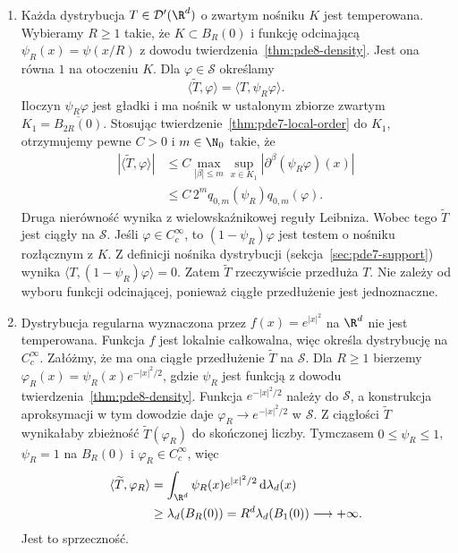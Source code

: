 \begin{przyklad}
\begin{enumerate}
\item Każda dystrybucja $T\in\mathcal D'(\R^d)$
o zwartym nośniku $K$ jest temperowana.
Wybieramy $R\ge1$ takie, że $K\subset B_R(0)$
i funkcję odcinającą $\psi_R(x)=\psi(x/R)$
z dowodu twierdzenia~\ref{thm:pde8-density}.
Jest ona równa $1$ na otoczeniu $K$.
Dla $\varphi\in\mathcal S$ określamy
\[
 \langle\widetilde T,\varphi\rangle
 =\langle T,\psi_R\varphi\rangle.
\]
Iloczyn $\psi_R\varphi$ jest gładki
i ma nośnik w ustalonym zbiorze zwartym
$K_1=\overline{B_{2R}(0)}$.
Stosując twierdzenie~\ref{thm:pde7-local-order}
do $K_1$, otrzymujemy pewne
$C>0$ i $m\in\N_0$ takie, że
\[
 \begin{aligned}
 |\langle\widetilde T,\varphi\rangle|
 &\le C\max_{|\beta|\le m}\sup_{x\in K_1}
 |\partial^\beta(\psi_R\varphi)(x)|\\
 &\le C\,2^m q_{0,m}(\psi_R)q_{0,m}(\varphi).
 \end{aligned}
\]
Druga nierówność wynika z wielowskaźnikowej
reguły Leibniza. Wobec tego $\widetilde T$
jest ciągły na $\mathcal S$.
Jeśli $\varphi\in C_c^\infty$, to
$(1-\psi_R)\varphi$ jest testem o nośniku
rozłącznym z $K$. Z definicji nośnika
dystrybucji (sekcja~\ref{sec:pde7-support})
wynika $\langle T,(1-\psi_R)\varphi\rangle=0$.
Zatem $\widetilde T$ rzeczywiście przedłuża $T$.
Nie zależy od wyboru funkcji odcinającej,
ponieważ ciągłe przedłużenie jest jednoznaczne.

\item Dystrybucja regularna wyznaczona przez
$f(x)=e^{|x|^2}$ na $\R^d$ nie jest temperowana.
Funkcja $f$ jest lokalnie całkowalna, więc
określa dystrybucję na $C_c^\infty$.
Załóżmy, że ma ona ciągłe przedłużenie
$\widetilde T$ na $\mathcal S$.
Dla $R\ge1$ bierzemy
$\varphi_R(x)=\psi_R(x)e^{-|x|^2/2}$,
gdzie $\psi_R$ jest funkcją z dowodu
twierdzenia~\ref{thm:pde8-density}.
Funkcja $e^{-|x|^2/2}$ należy do $\mathcal S$,
a konstrukcja aproksymacji w tym dowodzie
daje $\varphi_R\to e^{-|x|^2/2}$ w $\mathcal S$.
Z ciągłości $\widetilde T$ wynikałaby
zbieżność $\widetilde T(\varphi_R)$
do skończonej liczby. Tymczasem
$0\le\psi_R\le1$, $\psi_R=1$ na $B_R(0)$
i $\varphi_R\in C_c^\infty$, więc
\[
 \begin{aligned}
 \langle\widetilde T,\varphi_R\rangle
 &=\int_{\R^d}\psi_R(x)e^{|x|^2/2}
 \,\mathrm d\lambda_d(x)\\
 &\ge\lambda_d(B_R(0))
 =R^d\lambda_d(B_1(0))\longrightarrow+\infty.
 \end{aligned}
\]
Jest to sprzeczność.
\end{enumerate}
\end{przyklad}

